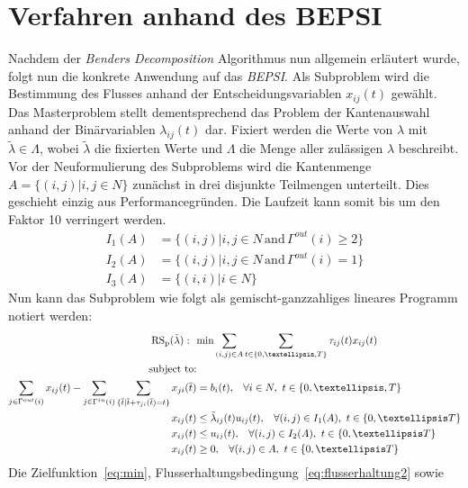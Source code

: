 \documentclass[a4paper, 11pt]{scrreprt}
\begin{document}
\section{Verfahren anhand des BEPSI}
Nachdem der \textit{Benders Decomposition} Algorithmus nun allgemein erläutert wurde, folgt
nun die konkrete Anwendung auf das \textit{BEPSI}.
Als Subproblem wird die Bestimmung des Flusses anhand der Entscheidungsvariablen $x_{ij}(t)$ gewählt.
Das Masterproblem stellt dementsprechend das Problem der Kantenauswahl anhand der Binärvariablen
$\lambda_{ij}(t)$ dar. Fixiert werden die Werte von $\lambda$ mit $\tilde{\lambda} \in \Lambda$,
wobei $\tilde{\lambda}$ die fixierten Werte und $\Lambda$ die Menge aller zulässigen $\lambda$
beschreibt.\\
Vor der Neuformulierung des Subproblems wird die Kantenmenge $A = \{(i, j) | i, j \in N\}$ zunächst in drei disjunkte
Teilmengen unterteilt. Dies geschieht einzig aus Performancegründen. Die Laufzeit kann somit bis um
den Faktor 10 verringert werden.
\begin{align*}
  I_1(A) &= \{(i,j)|i,j \in N \,\text{and}\, \Gamma^{out}(i)\geq 2\}\\
  I_2(A) &= \{(i,j)|i,j \in N \,\text{and}\, \Gamma^{out}(i) = 1\}\\
  I_3(A) &= \{(i,i)|i \in N \}
\end{align*}
Nun kann das Subproblem wie folgt als gemischt-ganzzahliges lineares Programm notiert werden:
\begin{align}
  \text{RS}_{\text{p}}(\tilde{\lambda}):\,\,\,\, & \text{min} \sum_{(i,j)\in A} \sum_{t \in \{0,…,T\}} \tau_{ij}(t)x_{ij}(t)\label{eq:min}\\
  \text{subject to:}&\notag\\
  \sum_{j \in \Gamma^{out} (i)}x_{ij}(t) - \sum_{j \in \Gamma^{in} (i)}\sum_{\{\overline{t}|\overline{t}+\tau_{ji}(\overline{t}) = t\}}x_{ji}(\overline{t}) &= b_i(t),\,\,\,\,\, \forall i \in N,\,\, t \in \{0,…,T\}\label{eq:flusserhaltung2}\\
  x_{ij}(t) &\leq \tilde{\lambda}_{ij}(t) u_{ij}(t),\,\,\,\,\, \forall (i,j) \in I_{1}(A),\,\, t \in \{0,…T\}\label{eq:kapazitaet1}\\
  x_{ij}(t) &\leq u_{ij}(t),\,\,\,\,\, \forall (i,j) \in I_{2}(A),\,\, t \in \{0,…T\}\label{eq:kapazitaet2}\\
  x_{ij}(t) &\geq 0,\,\,\,\,\, \forall (i,j) \in A,\,\, t \in \{0,…T\}\label{eq:nicht_negativ}
\end{align}
Die Zielfunktion~\ref{eq:min}, Flusserhaltungsbedingung~\ref{eq:flusserhaltung2} sowie
\end{document}
